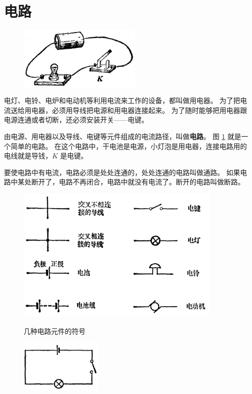 \section{电路}\label{sec:7-7}

\begin{figure}
    \centering
    \includegraphics[width=6cm]{../pic/czwl2-ch7-20}
    \caption{}\label{fig:7-20}
\end{figure}

电灯、电铃、电炉和电动机等利用电流来工作的设备，都叫做用电器。
为了把电流送给用电器，必须用导线把电源和用电器连接起来。
为了随时能够把用电器跟电源连通或者切断，还必须安装开关——电键。

由电源、用电器以及导线、电键等元件组成的电流路径，叫做\textbf{电路}。
图 \ref{fig:7-20} 就是一个简单的电路。
在这个电路中，干电池是电源，小灯泡是用电器，连接电路用的电线就是导钱，$K$ 是电键。

要使电路中有电流，电路必须是处处连通的，处处连通的电路叫做通路。
如果电路中某处断开了，电路不再闭合，电路中就没有电流了。断开的电路叫做断路。

\begin{figure}[htbp]
    \centering
    \begin{minipage}{11cm}
    \centering
    \includegraphics[width=10cm]{../pic/czwl2-ch7-21}
    \caption{几种电路元件的符号}\label{fig:7-21}
    \end{minipage}
    \qquad
    \begin{minipage}{5cm}
    \centering
    \vspace{4cm}
    \includegraphics[width=4cm]{../pic/czwl2-ch7-22}
    \caption{}\label{fig:7-22}
    \end{minipage}
\end{figure}


